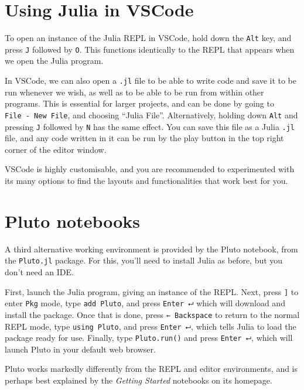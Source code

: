 \documentclass[
  letterpaper,
  DIV=11,
  numbers=noendperiod]{scrreprt}
\begin{document}
\hypertarget{using-julia-in-vscode}{%
\section{Using Julia in VSCode}\label{using-julia-in-vscode}}

To open an instance of the Julia REPL in VSCode, hold down the
\texttt{Alt} key, and press \texttt{J} followed by \texttt{O}. This
functions identically to the REPL that appears when we open the Julia
program.

In VSCode, we can also open a \texttt{.jl} file to be able to write code
and save it to be run whenever we wish, as well as to be able to be run
from within other programs. This is essential for larger projects, and
can be done by going to \texttt{File\ -\ New\ File}, and choosing
``Julia File''. Alternatively, holding down \texttt{Alt} and pressing
\texttt{J} followed by \texttt{N} has the same effect. You can save this
file as a Julia \texttt{.jl} file, and any code written in it can be run
by the play button in the top right corner of the editor window.

VSCode is highly customisable, and you are recommended to experimented
with its many options to find the layouts and functionalities that work
best for you.

\hypertarget{pluto-notebooks}{%
\section{Pluto notebooks}\label{pluto-notebooks}}

A third alternative working environment is provided by the Pluto
notebook, from the \texttt{Pluto.jl} package. For this, you'll need to
install Julia as before, but you don't need an IDE.

First, launch the Julia program, giving an instance of the REPL. Next,
press \texttt{{]}} to enter \texttt{Pkg} mode, type \texttt{add\ Pluto},
and press \texttt{Enter\ ⮠} which will download and install the package.
Once that is done, press \texttt{←\ Backspace} to return to the normal
REPL mode, type \texttt{using\ Pluto}, and press \texttt{Enter\ ⮠},
which tells Julia to load the package ready for use. Finally, type
\texttt{Pluto.run()} and press \texttt{Enter\ ⮠}, which will launch
Pluto in your default web browser.

Pluto works markedly differently from the REPL and editor environments,
and is perhaps best explained by the \emph{Getting Started} notebooks on
its homepage.
\end{document}
